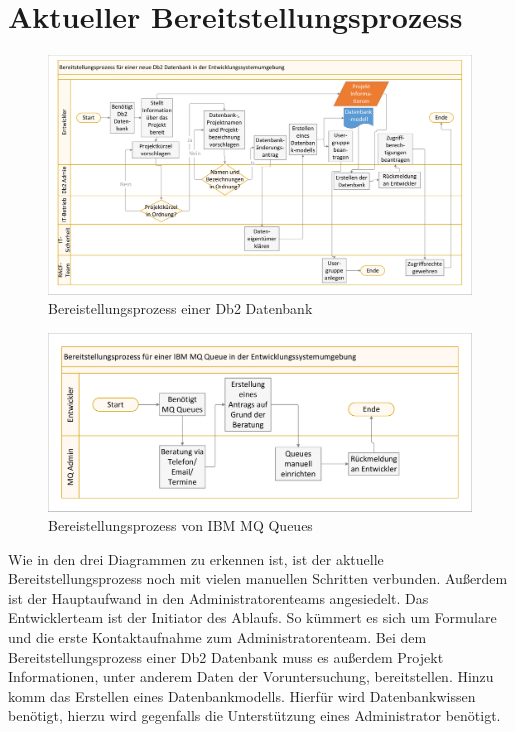 \section{Aktueller Bereitstellungsprozess}

 \begin{figure}[h]
\centering
\includegraphics[width=\paperwidth,angle=90]{figures/swimlaneDb2.pdf}
\caption{Bereistellungsprozess einer Db2 Datenbank}
\label{fig:aktdb2}
\end{figure}

 \begin{figure}[h]
\centering
\includegraphics[width=\paperwidth,angle=90]{figures/swimlaneMQ.pdf}
\caption{Bereistellungsprozess von IBM MQ Queues}
\label{fig:aktmq}
\end{figure}
Wie in den drei Diagrammen zu erkennen ist, ist der aktuelle Bereitstellungsprozess noch mit vielen manuellen Schritten verbunden.
Außerdem ist der Hauptaufwand in den Administratorenteams angesiedelt.
Das Entwicklerteam ist der Initiator des Ablaufs.
So kümmert es sich um Formulare und die erste Kontaktaufnahme zum Administratorenteam.
Bei dem Bereitstellungsprozess einer Db2 Datenbank muss es außerdem Projekt Informationen, unter anderem Daten der Voruntersuchung, bereitstellen.
Hinzu komm das Erstellen eines Datenbankmodells.
Hierfür wird Datenbankwissen benötigt, hierzu wird gegenfalls die Unterstützung eines Administrator benötigt.

